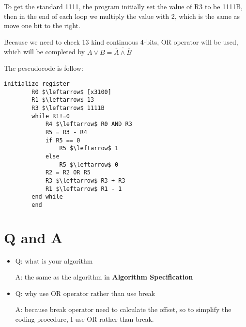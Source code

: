 \documentclass[twoside]{article}
\begin{document}
\begin{CJK*}{UTF8}{gbsn}
	To get the standard 1111, the program initially set the value of R3 to be 1111B, then in the end of each loop we multiply the value with 2, which is the same as move one bit to the right.
	
	Because we need to check 13 kind continuous 4-bits, OR operator will be used, which will be completed by $ A \vee B = \overline{\overline{A} \wedge \overline{B}} $
	

	The peseudocode is follow:
	\newpage
	\begin{lstlisting}[mathescape=true]
		initialize register
		R0 $\leftarrow$ [x3100]
		R1 $\leftarrow$ 13
		R3 $\leftarrow$ 1111B
		while R1!=0
			R4 $\leftarrow$ R0 AND R3
			R5 = R3 - R4
			if R5 == 0
				R5 $\leftarrow$ 1
			else 
				R5 $\leftarrow$ 0
			R2 = R2 OR R5
			R3 $\leftarrow$ R3 + R3
			R1 $\leftarrow$ R1 - 1
		end while
		end

	\end{lstlisting}

	

	\section{Q and A}
	\begin{itemize}
		\item 	Q: what is your algorithm
		
				A: the same as the algorithm in \textbf{Algorithm Specification}
		\item	Q: why use OR operator rather than use break
		
				A: because break operator need to calculate the offset, so to simplify the coding procedure, I use OR rather than break.
	\end{itemize}
	

	

\end{CJK*}
\end{document}
